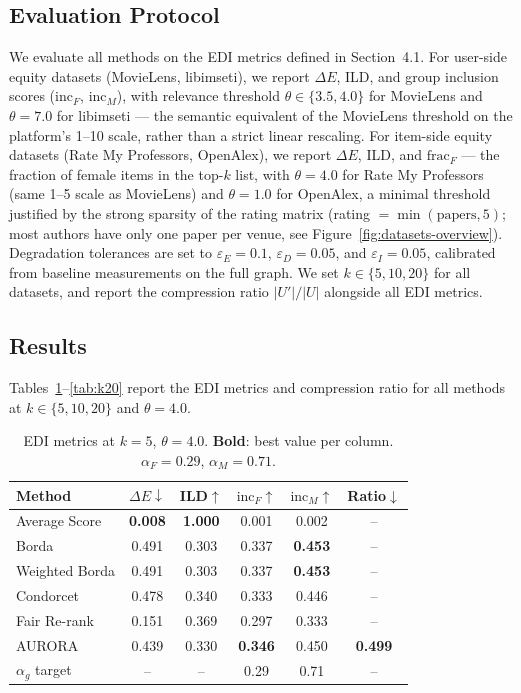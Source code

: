\documentclass[runningheads]{llncs}
\begin{document}
\subsection{Evaluation Protocol}

We evaluate all methods on the EDI metrics defined in Section~4.1.
For user-side equity datasets (MovieLens, libimseti), we report $\Delta E$,
ILD, and group inclusion scores ($\mathrm{inc}_F$, $\mathrm{inc}_M$), with
relevance threshold $\theta \in \{3.5, 4.0\}$ for MovieLens and
$\theta = 7.0$ for libimseti --- the semantic equivalent of the
MovieLens threshold on the platform's 1--10 scale, rather than a strict
linear rescaling. For item-side equity datasets (Rate My Professors,
OpenAlex), we report $\Delta E$, ILD, and $\mathrm{frac}_F$ — the fraction
of female items in the top-$k$ list, with $\theta = 4.0$ for Rate My
Professors (same 1--5 scale as MovieLens) and $\theta = 1.0$ for OpenAlex,
a minimal threshold justified by the strong sparsity of the rating matrix
(rating $= \min(\text{papers}, 5)$; most authors have only one paper per
venue, see Figure~\ref{fig:datasets-overview}).
Degradation tolerances are set to $\varepsilon_E = 0.1$, $\varepsilon_D = 0.05$,
and $\varepsilon_I = 0.05$, calibrated from baseline measurements on the full
graph. We set $k \in \{5, 10, 20\}$ for all datasets, and report the
compression ratio $|U'|/|U|$ alongside all EDI metrics.


\subsection{Results}

Tables~\ref{tab:k5}--\ref{tab:k20} report the EDI metrics and compression
ratio for all methods at $k \in \{5, 10, 20\}$ and $\theta = 4.0$.

\begin{table}[h!]
\centering
\caption{EDI metrics at $k=5$, $\theta=4.0$. \textbf{Bold}: best value
per column. $\alpha_F=0.29$, $\alpha_M=0.71$.}
\label{tab:k5}
\begin{tabular}{lccccc}
\hline
Method & $\Delta E\downarrow$ & ILD$\uparrow$ & $\mathrm{inc}_F\uparrow$
       & $\mathrm{inc}_M\uparrow$ & Ratio$\downarrow$ \\
\hline
Average Score & \textbf{0.008} & \textbf{1.000} & 0.001 & 0.002 & -- \\
Borda         & 0.491 & 0.303 & 0.337 & \textbf{0.453} & -- \\
Weighted Borda & 0.491 & 0.303 & 0.337 & \textbf{0.453} & -- \\
Condorcet     & 0.478 & 0.340 & 0.333 & 0.446 & -- \\
Fair Re-rank  & 0.151 & 0.369 & 0.297 & 0.333 & -- \\
AURORA          & 0.439 & 0.330 & \textbf{0.346} & 0.450 & \textbf{0.499} \\
\hline
$\alpha_g$ target & -- & -- & 0.29 & 0.71 & -- \\
\hline
\end{tabular}
\end{table}
\end{document}
